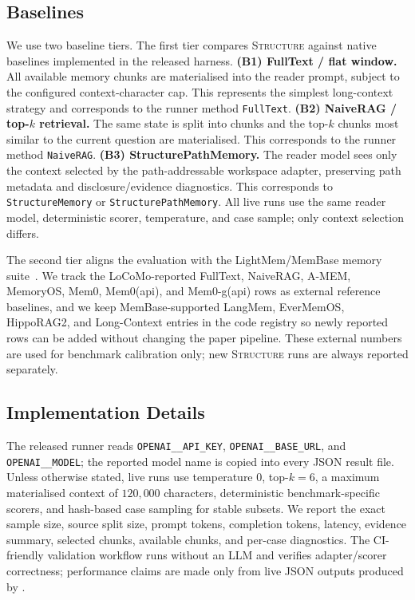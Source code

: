 \subsection{Baselines}

We use two baseline tiers. The first tier compares \textsc{Structure}
against native baselines implemented in the released harness.
\textbf{(B1) FullText / flat window.} All available memory chunks are
materialised into the reader prompt, subject to the configured
context-character cap. This represents the simplest long-context
strategy and corresponds to the runner method \texttt{FullText}.
\textbf{(B2) NaiveRAG / top-$k$ retrieval.} The same state is split
into chunks and the top-$k$ chunks most similar to the current question
are materialised. This corresponds to the runner method
\texttt{NaiveRAG}.
\textbf{(B3) StructurePathMemory.} The reader model sees only the
context selected by the path-addressable workspace adapter, preserving
path metadata and disclosure/evidence diagnostics. This corresponds to
\texttt{StructureMemory} or \texttt{StructurePathMemory}. All live runs
use the same reader model, deterministic scorer, temperature, and case
sample; only context selection differs.

The second tier aligns the evaluation with the LightMem/MemBase memory
suite~\citep{fang2026lightmem}. We track the LoCoMo-reported FullText,
NaiveRAG, A-MEM, MemoryOS, Mem0, Mem0(api), and Mem0-g(api) rows as
external reference baselines, and we keep MemBase-supported LangMem,
EverMemOS, HippoRAG2, and Long-Context entries in the code registry so
newly reported rows can be added without changing the paper pipeline.
These external numbers are used for benchmark calibration only; new
\textsc{Structure} runs are always reported separately.

\subsection{Implementation Details}

The released runner reads \texttt{OPENAI\_\_API\_KEY},
\texttt{OPENAI\_\_BASE\_URL}, and \texttt{OPENAI\_\_MODEL}; the
reported model name is copied into every JSON result file. Unless
otherwise stated, live runs use temperature $0$, top-$k=6$, a maximum
materialised context of $120{,}000$ characters, deterministic
benchmark-specific scorers, and hash-based case sampling for stable
subsets. We report the exact sample size, source split size, prompt
tokens, completion tokens, latency, evidence summary, selected chunks,
available chunks, and per-case diagnostics. The CI-friendly validation
workflow runs without an LLM and verifies adapter/scorer correctness;
performance claims are made only from live JSON outputs produced by
.

